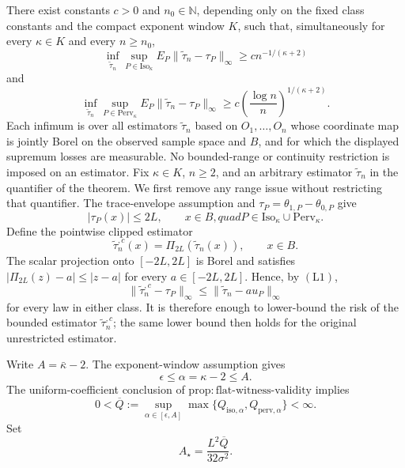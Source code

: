 There exist constants \(c>0\) and \(n_0\in\mathbb N\), depending only on the fixed class constants and the compact exponent window \(K\), such that, simultaneously for every \(\kappa\in K\) and every \(n\geq n_0\),
\[
 \inf_{\widetilde\tau_n}\sup_{P\in\mathrm{Iso}_\kappa}
 E_P\|\widetilde\tau_n-\tau_P\|_\infty
 \geq c n^{-1/(\kappa+2)}
\]
and
\[
 \inf_{\widetilde\tau_n}\sup_{P\in\mathrm{Perv}_\kappa}
 E_P\|\widetilde\tau_n-\tau_P\|_\infty
 \geq c\left(\frac{\log n}{n}\right)^{1/(\kappa+2)}.
\]
Each infimum is over all estimators \(\widetilde\tau_n\) based on \(O_1,\ldots,O_n\) whose coordinate map is jointly Borel on the observed sample space and \(B\), and for which the displayed supremum losses are measurable.  No bounded-range or continuity restriction is imposed on an estimator.
Fix \(\kappa\in K\), \(n\geq2\), and an arbitrary estimator \(\widetilde\tau_n\) in the quantifier of the theorem.  We first remove any range issue without restricting that quantifier.  The trace-envelope assumption and \(\tau_P=\theta_{1,P}-\theta_{0,P}\) give
\[
 |\tau_P(x)|\leq2L,
 \qquad x\in B,quad
 P\in\mathrm{Iso}_\kappa\cup\mathrm{Perv}_\kappa.
 \tag{L1}
\]
Define the pointwise clipped estimator
\[
 \widetilde\tau_n^{,c}(x)=\Pi_{2L}\!\left(\widetilde\tau_n(x)\right),
 \qquad x\in B.
 \tag{L2}
\]
The scalar projection onto \([-2L,2L]\) is Borel and satisfies
\(|\Pi_{2L}(z)-a|\leq|z-a|\) for every \(a\in[-2L,2L]\).  Hence, by \((\mathrm{L1})\),
\[
 \|\widetilde\tau_n^{,c}-\tau_P\|_\infty
 \leq\|\widetilde\tau_n-	au_P\|_\infty
 \tag{L3}
\]
for every law in either class.  It is therefore enough to lower-bound the risk of the bounded estimator \(\widetilde\tau_n^{,c}\); the same lower bound then holds for the original unrestricted estimator.

Write \(A=\bar\kappa-2\).  The exponent-window assumption gives
\[
 \epsilon\leq\alpha=\kappa-2\leq A.
 \tag{L4}
\]
The uniform-coefficient conclusion of
\(\mathrm{prop{:}flat\text{-}witness\text{-}validity}\) implies
\[
 0<\overline Q:=
 \sup_{\alpha\in[\epsilon,A]}
 \max\{Q_{\mathrm{iso},\alpha},Q_{\mathrm{perv},\alpha}\}<\infty.
 \tag{L5}
\]
Set
\[
 A_\star=\frac{L^2\overline Q}{32\sigma^2}.
 \tag{L6}
\]

